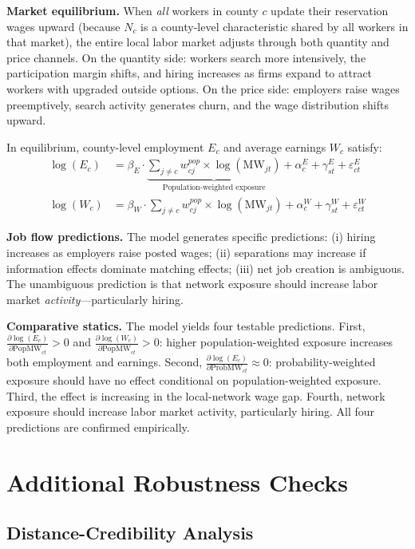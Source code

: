 \documentclass[12pt]{article}
\begin{document}
\textbf{Market equilibrium.} When \textit{all} workers in county $c$ update their reservation wages upward (because $N_c$ is a county-level characteristic shared by all workers in that market), the entire local labor market adjusts through both quantity and price channels. On the quantity side: workers search more intensively, the participation margin shifts, and hiring increases as firms expand to attract workers with upgraded outside options. On the price side: employers raise wages preemptively, search activity generates churn, and the wage distribution shifts upward.

In equilibrium, county-level employment $E_c$ and average earnings $W_c$ satisfy:
\begin{align}
\log(E_c) &= \beta_E \cdot \underbrace{\sum_{j \neq c} w^{pop}_{cj} \times \log(\text{MW}_{jt})}_{\text{Population-weighted exposure}} + \alpha^E_c + \gamma^E_{st} + \varepsilon^E_{ct} \\
\log(W_c) &= \beta_W \cdot \sum_{j \neq c} w^{pop}_{cj} \times \log(\text{MW}_{jt}) + \alpha^W_c + \gamma^W_{st} + \varepsilon^W_{ct}
\end{align}

\textbf{Job flow predictions.} The model generates specific predictions: (i) hiring increases as employers raise posted wages; (ii) separations may increase if information effects dominate matching effects; (iii) net job creation is ambiguous. The unambiguous prediction is that network exposure should increase labor market \textit{activity}---particularly hiring.

\textbf{Comparative statics.} The model yields four testable predictions.
First, $\frac{\partial \log(E_c)}{\partial \text{PopMW}_{ct}} > 0$ and
$\frac{\partial \log(W_c)}{\partial \text{PopMW}_{ct}} > 0$: higher population-weighted
exposure increases both employment and earnings.
Second, $\frac{\partial \log(E_c)}{\partial \text{ProbMW}_{ct}} \approx 0$:
probability-weighted exposure should have no effect conditional on population-weighted
exposure. Third, the effect is increasing in the local-network wage gap. Fourth, network
exposure should increase labor market activity, particularly hiring. All four predictions
are confirmed empirically.


\section{Additional Robustness Checks}
\label{sec:appendix_robustness}

\subsection{Distance-Credibility Analysis}
\end{document}
